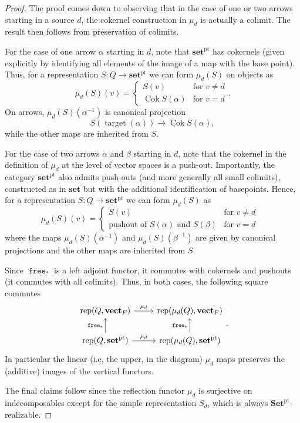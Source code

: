 \documentclass[a4paper]{amsart}
\theoremstyle{plain}
\theoremstyle{definition}
\theoremstyle{remark}
\newcommand{\funct}[1]{\operatorname{\mathtt{#1}}}
\newcommand{\set}{\mathbf{set}}
\newcommand{\pSet}{\mathbf{Set}^\mathrm{pt}}
\newcommand{\pset}{\mathbf{set}^\mathrm{pt}}
\newcommand{\vectF}{\mathbf{vect}_F}
\DeclareMathOperator{\rep}{rep}
\begin{document}
\begin{proof}
The proof comes down to observing that in the case of one or two arrows starting in a source $d$, the cokernel construction in $\mu_d$ is actually a colimit. The result then follows from preservation of colimits. 


For the case of one arrow $\alpha$ starting in \( d \), note that \( \pset \) has cokernels (given explicitly by identifying all elements of the image of a map with the base point). Thus, for a representation \( S \colon Q \to \pset \) we can form \( \mu_d(S) \) on objects as
\[ \mu_d(S)(v) = \begin{cases} S(v) & \text{for } v \neq d \\ \operatorname{Cok} S(\alpha) & \text{for } v = d \end{cases}. \]
On arrows, $\mu_d(S)(\alpha^{-1})$ is canonical projection  
\[S(\operatorname{target}(\alpha))\to \operatorname{Cok} S(\alpha),\] while the other maps are inherited from $S$.

For the case of two arrows $\alpha$ and $\beta$ starting in \( d \), note that the cokernel in the definition of \( \mu_d \) at the level of vector spaces is a push-out. Importantly, the category $\pset$ also admits push-outs (and more generally all small colimits), constructed as in $\set$ but with the additional identification of basepoints. Hence, for a representation \( S \colon Q \to \pset \) we can form \( \mu_d(S) \) as
\[ \mu_d(S)(v) = \begin{cases} S(v) & \text{for } v \neq d \\ \text{pushout of } S(\alpha) \text{ and }  S(\beta) & \text{for $v = d$ } \end{cases} \]
where the maps $\mu_d(S)(\alpha^{-1})$ and $\mu_d(S)(\beta^{-1})$ are given by canonical projections and the other maps are inherited from $S$. 


Since \( \funct{free}_* \) is a left adjoint functor, it commutes with cokernels and pushouts (it commutes with all colimits). Thus, in both cases, the following square commutes
\[
\begin{tikzcd}
\rep(Q, \vectF)\ar[r, "\mu_d"] & \rep(\mu_d(Q), \vectF) \\
\rep(Q, \pset)\ar[r,"\mu_d"]\ar[u, "\funct{free}_*"] & \rep(\mu_d(Q), \pset)\ar[u, "\funct{free}_*"]
\end{tikzcd}.
\]
In particular the linear (i.e, the upper, in the diagram) \( \mu_d \) maps preserves the (additive) images of the vertical functors.

The final claims follow since the reflection functor \( \mu_d \) is surjective on indecomposables except for the simple representation \( S_d \), which is always \( \pSet \)-realizable.
\end{proof}
\end{document}
